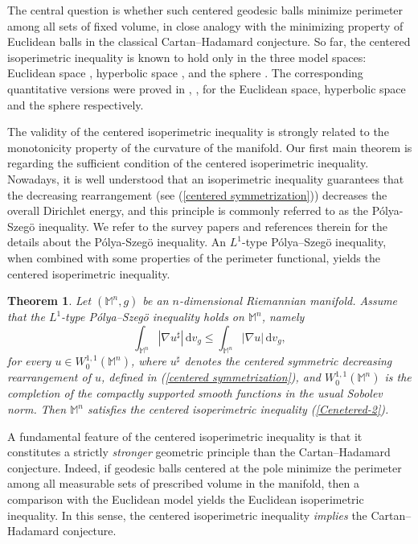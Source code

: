 \documentclass[a4paper,11pt,reqno]{amsart}
\renewcommand\eqref[1]{(\ref{#1})}
\theoremstyle{plain}
\newtheorem{theorem}{Theorem}[section]
\numberwithin{equation}{section} \allowdisplaybreaks
\newcommand{\m}{\mathbb{M}^n}
\begin{document}
\medskip


 The central question is whether such centered geodesic balls minimize perimeter among all sets of fixed volume, in close analogy with the minimizing property of Euclidean balls in the classical Cartan–Hadamard conjecture. So far, the centered isoperimetric inequality is known to hold only in the three model spaces: Euclidean space \cite{Ros}, hyperbolic space \cite{Schmidt}, and the sphere \cite{ps-ball}. The corresponding quantitative versions were proved in \cite{FMP}, \cite{ps-hn}, \cite{Fusco} for the Euclidean space, hyperbolic space and the sphere respectively.

The validity of the centered isoperimetric inequality is strongly related to the monotonicity property of the curvature of the manifold.
 Our first main theorem is regarding the sufficient condition of the centered isoperimetric inequality.  Nowadays, it is well understood that an isoperimetric inequality guarantees that
the decreasing rearrangement (see \eqref{centered symmetrization}) decreases the overall Dirichlet energy, and
this principle is commonly referred to as the P\'olya-Szeg\"o inequality. We refer to the survey papers \cite{Talenti} and references therein for the details about the P\'olya-Szeg\"o inequality. An $L^1$-type P\'olya--Szeg\"o inequality, when combined with some properties of the perimeter functional, yields the centered isoperimetric inequality.

\begin{theorem}\label{first}
Let $(\m, g)$ be an $n$-dimensional Riemannian manifold. 
Assume that the $L^1$-type P\'olya--Szeg\"o inequality holds on $\m$, namely
\[
    \int_{\m} |\nabla u^\sharp| \, \mathrm{d}v_g
    \le 
    \int_{\m} |\nabla u| \, \mathrm{d}v_g,
\]
for every $u \in W^{1,1}_0(\m)$, where $u^\sharp$ denotes the centered symmetric decreasing rearrangement of $u$, defined in \eqref{centered symmetrization}, and $W_0^{1,1}(\m)$ is the completion of the compactly supported smooth functions in the usual Sobolev norm. Then $\m$ satisfies the centered isoperimetric inequality \eqref{Cenetered-2}.
\end{theorem}

\medskip

A fundamental feature of the centered isoperimetric inequality is that it constitutes a strictly \emph{stronger} geometric principle than the Cartan--Hadamard conjecture. 
Indeed, if geodesic balls centered at the pole minimize the perimeter among all measurable sets of prescribed volume in the manifold, then a comparison with the Euclidean model yields the Euclidean isoperimetric inequality. In this sense, the centered isoperimetric inequality \textit{implies} the Cartan--Hadamard conjecture.
\end{document}
